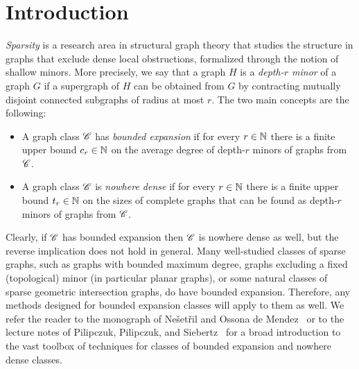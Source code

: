 \section{Introduction}\label{sec:intro}

\emph{Sparsity} is a research area in structural graph theory that studies the structure in graphs that exclude dense local obstructions, formalized through the notion of shallow minors. More precisely, we say that a graph $H$ is a \emph{depth-$r$ minor} of a graph $G$ if a supergraph of $H$ can be obtained from $G$ by contracting mutually disjoint connected subgraphs of radius at most $r$. The two main concepts are the following:
\begin{itemize}
	\item A graph class $\mathscr C$ has \emph{bounded expansion} if for every $r\in \mathbb{N}$ there is a finite upper bound $c_r\in \mathbb{N}$ on the average degree of depth-$r$ minors of graphs from $\mathscr C$.
	\item A graph class $\mathscr C$ is \emph{nowhere dense} if for every $r\in \mathbb{N}$ there is a finite upper bound $t_r\in \mathbb{N}$ on the sizes of complete graphs that can be found as depth-$r$ minors of graphs from $\mathscr C$.
\end{itemize}
Clearly, if $\mathscr C$ has bounded expansion then $\mathscr C$ is nowhere dense as well, but the reverse implication does not hold in general. Many well-studied classes of sparse graphs, such as graphs with bounded maximum degree, graphs excluding a fixed (topological) minor (in particular planar graphs), or some natural classes of sparse geometric intersection graphs, do have bounded expansion. Therefore, any methods designed for bounded expansion classes will apply to them as well. We refer the reader to the monograph of Ne\v{s}et\v{r}il and Ossona de Mendez~\cite{sparsity} or to the lecture notes of Pilipczuk, Pilipczuk, and Siebertz~\cite{sparsityNotes} for a broad introduction to the vast toolbox of techniques for classes of bounded expansion and nowhere dense classes.

